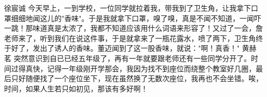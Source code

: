 {}\markdownRendererInterblockSeparator
{}徐宸诚\markdownRendererInterblockSeparator
{}今天早上，一到学校，一位同学就拉着我，带我到了卫生角，让我拿下口罩细细地闻这儿的"香味"。于是我就拿下口罩，嗅了嗅，真是不闻不知道，一闻吓一跳！那味道真是太浓了，我都不知道应该用什么词语来形容了！又过了一会，詹老师来了，听到我们在说这件事，于是就拿来了一瓶花露水，喷了两下，卫生角终于好了，发出了诱人的香味。董迈闻到了这一股香味，就说："啊！真香！"\markdownRendererInterblockSeparator
{}\markdownRendererInterblockSeparator
{}黄赫茗\markdownRendererInterblockSeparator
{}突然意识到自已已经五年级了，再有一年就要跟老师还有一些同学分开了。时间过得真快，记得一年级刚开学那会，我因为找不到座位而绕整个教室好几圈，最后只好随便找了一个座位坐下，现在虽然换了无数次座位，我再也不会坐错。唉，时间，如果人生若只如初见，那该有多好啊！\markdownRendererDocumentEnd